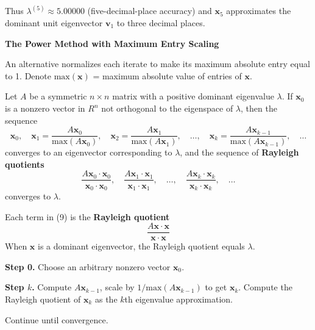 \documentclass{article}
\newcommand{\redheading}[1]{{\vspace{2mm}\noindent\Large\bfseries\color{red!55!black} #1\par}\vspace{2mm}}
\begin{document}
Thus $\lambda^{(5)}\approx 5.00000$ (five-decimal-place accuracy) and $\mathbf{x}_5$
approximates the dominant unit eigenvector $\mathbf{v}_1$ to three decimal places.

\vspace{2mm}
\redheading{The Power Method with Maximum Entry Scaling}

An alternative normalizes each iterate to make its maximum absolute entry equal to 1.
Denote $\mathrm{max}(\mathbf{x})$ = maximum absolute value of entries of $\mathbf{x}$.

\begin{tcolorbox}[colback=red!4, colframe=red!60!black,
  title={\textbf{Theorem 9.2.2}}, boxrule=0.5mm, arc=3mm]
Let $A$ be a symmetric $n\times n$ matrix with a positive dominant eigenvalue $\lambda$.
If $\mathbf{x}_0$ is a nonzero vector in $R^n$ not orthogonal to the eigenspace of
$\lambda$, then the sequence
\begin{equation}
  \mathbf{x}_0,\quad
  \mathbf{x}_1 = \frac{A\mathbf{x}_0}{\mathrm{max}(A\mathbf{x}_0)},\quad
  \mathbf{x}_2 = \frac{A\mathbf{x}_1}{\mathrm{max}(A\mathbf{x}_1)},\quad\ldots,\quad
  \mathbf{x}_k = \frac{A\mathbf{x}_{k-1}}{\mathrm{max}(A\mathbf{x}_{k-1})},\quad\ldots
  \tag{8}
\end{equation}
converges to an eigenvector corresponding to $\lambda$, and the sequence of
\textbf{Rayleigh quotients}
\begin{equation}
  \frac{A\mathbf{x}_0\cdot\mathbf{x}_0}{\mathbf{x}_0\cdot\mathbf{x}_0},\quad
  \frac{A\mathbf{x}_1\cdot\mathbf{x}_1}{\mathbf{x}_1\cdot\mathbf{x}_1},\quad\ldots,\quad
  \frac{A\mathbf{x}_k\cdot\mathbf{x}_k}{\mathbf{x}_k\cdot\mathbf{x}_k},\quad\ldots
  \tag{9}
\end{equation}
converges to $\lambda$.
\end{tcolorbox}

Each term in (9) is the \textbf{Rayleigh quotient}
\[
  \frac{A\mathbf{x}\cdot\mathbf{x}}{\mathbf{x}\cdot\mathbf{x}} \tag{11}
\]
When $\mathbf{x}$ is a dominant eigenvector, the Rayleigh quotient equals $\lambda$.

\begin{tcolorbox}[colback=blue!4, colframe=blue!55!black,
  title={\textbf{The Power Method with Maximum Entry Scaling}},
  boxrule=0.5mm, arc=3mm]
\textbf{Step 0.} Choose an arbitrary nonzero vector $\mathbf{x}_0$.

\textbf{Step $k$.} Compute $A\mathbf{x}_{k-1}$, scale by $1/\mathrm{max}(A\mathbf{x}_{k-1})$
to get $\mathbf{x}_k$. Compute the Rayleigh quotient of $\mathbf{x}_k$ as the $k$th
eigenvalue approximation.

Continue until convergence.
\end{tcolorbox}
\end{document}
